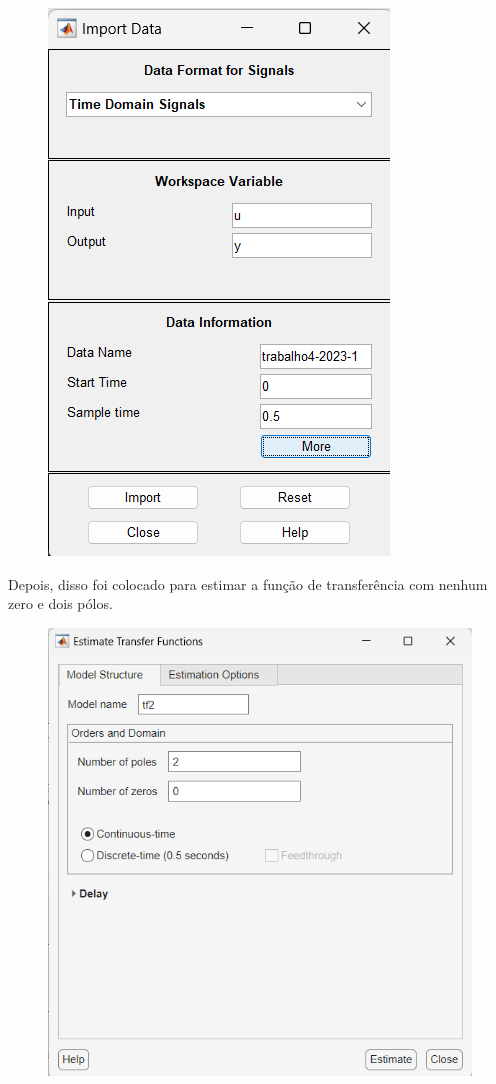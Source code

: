 \documentclass[10pt]{article}
\begin{document}
\begin{figure}[h]
    \centering
    \includegraphics[scale=0.5]{si1.png}
\end{figure}

\quad Depois, disso foi colocado para estimar a função de transferência com nenhum zero e dois pólos.

\begin{figure}[h]
    \centering
    \includegraphics[scale=0.4]{si2.png}
\end{figure}
\end{document}
